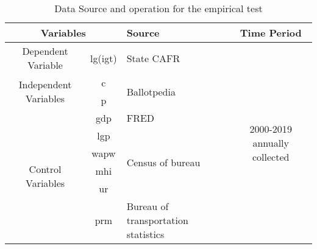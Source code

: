 \clearpage
\begin{table}
    \centering
    \caption{Data Source and operation for the empirical test}
    \begin{tabular}{ccp{8.785em}c}
        \toprule
        \multicolumn{2}{p{13.93em}}{Variables }                                         & Source  & \multicolumn{1}{p{7.785em}}{Time Period}                                                                         \\
        \midrule
        \multicolumn{1}{p{7em}}{Dependent Variable}                                     & lg(igt) & State CAFR                               & \multicolumn{1}{c}{\multirow{9}[18]{*}{2000-2019 annually collected}} \\
        \cmidrule{1-3}    \multicolumn{1}{c}{\multirow{2}[4]{*}{Independent Variables}} & c       & \multirow{2}[4]{*}{Ballotpedia}          &                                                                       \\
        \cmidrule{2-2}                                                                  & p       & \multicolumn{1}{c}{}                     &                                                                       \\
        \cmidrule{1-3}    \multicolumn{1}{c}{\multirow{6}[12]{*}{Control Variables}}    & gdp     & FRED                                     &                                                                       \\
        \cmidrule{2-3}                                                                  & lgp     & \multirow{4}[8]{*}{Census of bureau}     &                                                                       \\
        \cmidrule{2-2}                                                                  & wapw    & \multicolumn{1}{c}{}                     &                                                                       \\
        \cmidrule{2-2}                                                                  & mhi     & \multicolumn{1}{c}{}                     &                                                                       \\
        \cmidrule{2-2}                                                                  & ur      & \multicolumn{1}{c}{}                     &                                                                       \\
        \cmidrule{2-3}                                                                  & prm     & Bureau of transportation statistics      &                                                                       \\
        \bottomrule
    \end{tabular}%
    \label{Table A.1}%
\end{table}%
